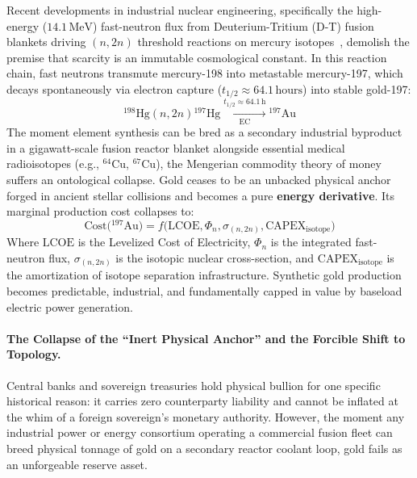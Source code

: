 \documentclass[a4paper,11pt,twoside,parskip=half-,headings=small]{scrartcl}
\begin{document}
Recent developments in industrial nuclear engineering, specifically the high-energy ($14.1\,\text{MeV}$) fast-neutron flux from Deuterium-Tritium (D-T) fusion blankets driving $(n, 2n)$ threshold reactions on mercury isotopes~\cite{marathon2025fusion}, demolish the premise that scarcity is an immutable cosmological constant. In this reaction chain, fast neutrons transmute mercury-198 into metastable mercury-197, which decays spontaneously via electron capture ($t_{1/2} \approx 64.1\,\text{hours}$) into stable gold-197:
\begin{equation}
  {}^{198}\text{Hg}(n, 2n){}^{197}\text{Hg} \xrightarrow[\text{EC}]{t_{1/2} \approx 64.1\,\text{h}} {}^{197}\text{Au}
  \label{eq:mercury_gold_transmutation}
\end{equation}
The moment element synthesis can be bred as a secondary industrial byproduct in a gigawatt-scale fusion reactor blanket alongside essential medical radioisotopes (e.g., ${}^{64}\text{Cu}$, ${}^{67}\text{Cu}$), the Mengerian commodity theory of money suffers an ontological collapse. Gold ceases to be an unbacked physical anchor forged in ancient stellar collisions and becomes a pure \textbf{energy derivative}. Its marginal production cost collapses to:
\begin{equation}
  \text{Cost}\bigl({}^{197}\text{Au}\bigr) = f\bigl(\text{LCOE}, \Phi_n, \sigma_{(n,2n)}, \text{CAPEX}_{\text{isotope}}\bigr)
  \label{eq:gold_cost_function}
\end{equation}
Where $\text{LCOE}$ is the Levelized Cost of Electricity, $\Phi_n$ is the integrated fast-neutron flux, $\sigma_{(n,2n)}$ is the isotopic nuclear cross-section, and $\text{CAPEX}_{\text{isotope}}$ is the amortization of isotope separation infrastructure. Synthetic gold production becomes predictable, industrial, and fundamentally capped in value by baseload electric power generation.

\paragraph{The Collapse of the ``Inert Physical Anchor'' and the Forcible Shift to Topology.}
Central banks and sovereign treasuries hold physical bullion for one specific historical reason: it carries zero counterparty liability and cannot be inflated at the whim of a foreign sovereign's monetary authority. However, the moment any industrial power or energy consortium operating a commercial fusion fleet can breed physical tonnage of gold on a secondary reactor coolant loop, gold fails as an unforgeable reserve asset.
\end{document}
